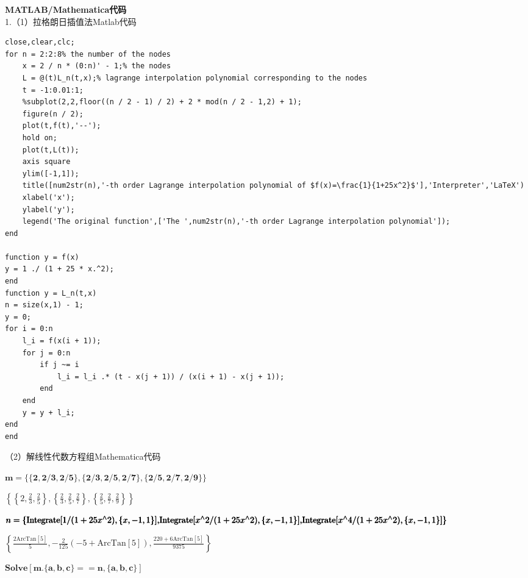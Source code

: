 \documentclass[10pt,a4paper]{article}
\begin{document}
\textbf{MATLAB/Mathematica代码}\\
1.（1）拉格朗日插值法Matlab代码
\begin{lstlisting}
close,clear,clc;
for n = 2:2:8% the number of the nodes
    x = 2 / n * (0:n)' - 1;% the nodes
    L = @(t)L_n(t,x);% lagrange interpolation polynomial corresponding to the nodes
    t = -1:0.01:1;
    %subplot(2,2,floor((n / 2 - 1) / 2) + 2 * mod(n / 2 - 1,2) + 1);
    figure(n / 2);
    plot(t,f(t),'--');
    hold on;
    plot(t,L(t));
    axis square
    ylim([-1,1]);
    title([num2str(n),'-th order Lagrange interpolation polynomial of $f(x)=\frac{1}{1+25x^2}$'],'Interpreter','LaTeX')
    xlabel('x');
    ylabel('y');
    legend('The original function',['The ',num2str(n),'-th order Lagrange interpolation polynomial']);
end

function y = f(x)
y = 1 ./ (1 + 25 * x.^2);
end
function y = L_n(t,x)
n = size(x,1) - 1;
y = 0;
for i = 0:n
    l_i = f(x(i + 1));
    for j = 0:n
        if j ~= i
            l_i = l_i .* (t - x(j + 1)) / (x(i + 1) - x(j + 1));
        end
    end
    y = y + l_i;
end
end
\end{lstlisting}
（2）解线性代数方程组Mathematica代码\\
\begin{doublespace}
\noindent\(\pmb{m=\{\{2,2/3,2/5\},\{2/3,2/5,2/7\},\{2/5,2/7,2/9\}\}}\)
\end{doublespace}

\begin{doublespace}
\noindent\(\left\{\left\{2,\frac{2}{3},\frac{2}{5}\right\},\left\{\frac{2}{3},\frac{2}{5},\frac{2}{7}\right\},\left\{\frac{2}{5},\frac{2}{7},\frac{2}{9}\right\}\right\}\)
\end{doublespace}

\begin{doublespace}
\noindent\(\pmb{n=\{\text{Integrate}[1/(1+25 x{}^{\wedge}2),\{x,-1,1\}],}\\
\pmb{\text{Integrate}[x{}^{\wedge}2/(1+25 x{}^{\wedge}2),\{x,-1,1\}],}\\
\pmb{\text{Integrate}[x{}^{\wedge}4/(1+25 x{}^{\wedge}2),\{x,-1,1\}]\}}\)
\end{doublespace}

\begin{doublespace}
\noindent\(\left\{\frac{2 \text{ArcTan}[5]}{5},-\frac{2}{125} (-5+\text{ArcTan}[5]),\frac{220+6 \text{ArcTan}[5]}{9375}\right\}\)
\end{doublespace}

\begin{doublespace}
\noindent\(\pmb{\text{Solve}[m.\{a,b,c\}==n,\{a,b,c\}]}\)
\end{doublespace}
\end{document}
